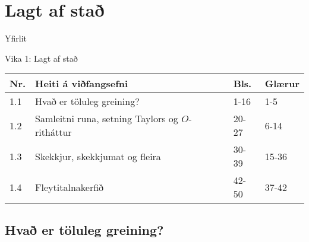 \date{7.~og 9.~janúar 2015}



\begin{frame}
	\maketitle
\end{frame}

\section{Lagt af stað}

\begin{frame}{Yfirlit}
\begin{block}{Vika 1: Lagt af stað}
\begin{center}
\begin{tabular}{|l|l|l|l|}\hline
Nr. &Heiti á viðfangsefni &Bls.&Glærur\\
\hline
1.1 & Hvað er töluleg greining?&1-16&1-5\\
1.2 & Samleitni runa, setning Taylors og $O$-ritháttur& 20-27&6-14\\
1.3 & Skekkjur, skekkjumat og fleira &30-39 &15-36 \\
1.4 & Fleytitalnakerfið& 42-50&37-42\\

\hline
\end{tabular}
\end{center}
\end{block}
\end{frame}

\subsection{Hvað er töluleg greining?}

